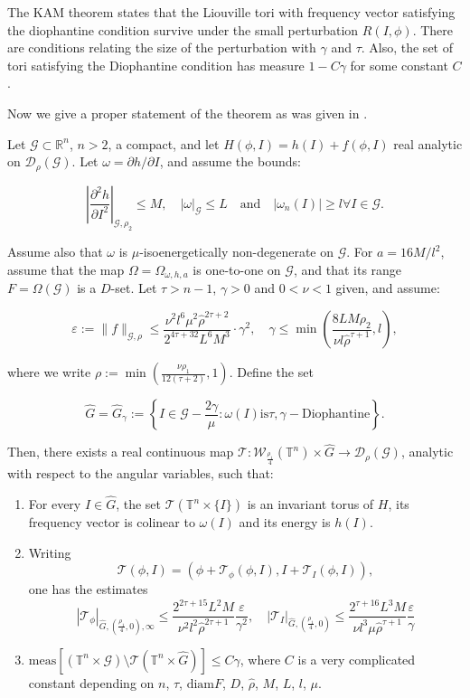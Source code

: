 The KAM theorem states that the Liouville tori with frequency vector satisfying the diophantine condition survive under the small perturbation $R(I,\phi)$. There are conditions relating the size of the perturbation with $\gamma$ and $\tau$. Also, the set of tori satisfying the Diophantine condition has measure $1 - C\gamma$ for some constant $C$.

Now we give a proper statement of the theorem as was given in \cite{D}.

\begin{theorem}\label{theorem:standard_KAM}
Let $\mathcal{G} \subset \mathbb{R}^n$, $n > 2$, a compact, and let $H(\phi,I) = h(I) + f(\phi,I)$ real analytic on $\mathcal{D}_\rho(\mathcal{G})$. Let $\omega = \partial h/\partial I$, and assume the bounds:

$$\left|\frac{\partial^2 h}{\partial I^2}\right|_{\mathcal{G}, \rho_2} \leq M, \quad |\omega|_{\mathcal{G}} \leq L \quad \text{and} \quad |\omega_n(I)| \geq l \forall I \in \mathcal{G}.$$

Assume also that $\omega$ is $\mu$-isoenergetically non-degenerate on $\mathcal{G}$. For $a = 16M/l^2$, assume that the map $\Omega = \Omega_{\omega,h,a}$ is one-to-one on $\mathcal{G}$, and that its range $F = \Omega(\mathcal{G})$ is a $D$-set. Let $\tau > n-1$, $\gamma > 0$ and $0 < \nu < 1$ given, and assume:

$$\varepsilon := \|f\|_{\mathcal{G},\rho} \leq \frac{\nu^2 l^6 \mu^2 \hat \rho^{2\tau+2}}{2^{4\tau+32}L^6 M^3}\cdot \gamma^2, \quad \gamma \leq \min\left(\frac{8L M\rho_2}{\nu l \hat \rho^{\tau+1}}, l\right),$$

where we write $\rho := \min \left(\frac{\nu \rho_1}{12(\tau+2)},1\right)$. Define the set

$$\hat G = \hat G_\gamma := \left\{I \in \mathcal{G} - \frac{2\gamma}{\mu} : \omega(I) \text{is} \tau,\gamma-\text{Diophantine} \right\}.$$

Then, there exists a real continuous map $\mathcal{T}:\mathcal{W}_{\frac{\rho_1}{4}}(\mathbb{T}^n)\times \hat G \rightarrow \mathcal{D}_\rho(\mathcal{G})$, analytic with respect to the angular variables, such that:

\begin{enumerate}
\item For every $I \in \hat G$, the set $\mathcal{T}(\mathbb{T}^n\times\{I\})$ is an invariant torus of $H$, its frequency vector is colinear to $\omega(I)$ and its energy is $h(I)$.
\item Writing
$$\mathcal{T}(\phi,I) = (\phi + \mathcal{T}_\phi(\phi,I), I + \mathcal{T}_I(\phi,I)),$$
one has the estimates
$$|\mathcal{T}_\phi|_{\hat G, (\frac{\rho_1}{4},0), \infty} \leq \frac{2^{2\tau+15} L^2 M}{\nu^2 l^2 \hat \rho^{2\tau+1}}\frac{\varepsilon}{\gamma^2}, \quad |\mathcal{T}_I|_{\hat G, (\frac{\rho_1}{4},0)} \leq \frac{2^{\tau+16} L^3 M}{\nu l^3 \mu \hat \rho^{\tau+1}}\frac{\varepsilon}{\gamma}$$
\item $\text{meas}[(\mathbb{T}^n\times \mathcal{G}) \setminus \mathcal{T}(\mathbb{T}^n\times \hat G)] \leq C\gamma$, where $C$ is a very complicated constant depending on $n$, $\tau$, $\text{diam} F$, $D$, $\hat{\rho}$, $M$,  $L$,  $l$,  $\mu$.


\end{enumerate}
\end{theorem}

